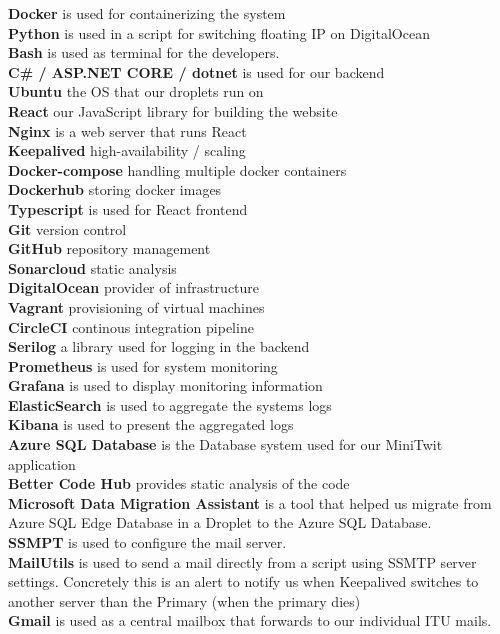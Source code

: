 \textbf{Docker} is used for containerizing the system \\
\textbf{Python} is used in a script for switching floating IP on DigitalOcean  \\
\textbf{Bash} is used as terminal for the developers. \\
\textbf{C\# / ASP.NET CORE / dotnet} is used for our backend \\
\textbf{Ubuntu} the OS that our droplets run on\\
\textbf{React} our JavaScript library for building the website \\
\textbf{Nginx} is a web server that runs React\\
\textbf{Keepalived} high-availability / scaling \\
\textbf{Docker-compose} handling multiple docker containers \\
\textbf{Dockerhub} storing docker images \\
\textbf{Typescript} is used for React frontend \\
\textbf{Git} version control \\
\textbf{GitHub} repository management \\
\textbf{Sonarcloud} static analysis \\
\textbf{DigitalOcean} provider of infrastructure \\
\textbf{Vagrant} provisioning of virtual machines \\
\textbf{CircleCI} continous integration pipeline \\
\textbf{Serilog} a library used for logging in the backend \\
\textbf{Prometheus} is used for system monitoring \\
\textbf{Grafana} is used to display monitoring information \\
\textbf{ElasticSearch} is used to aggregate the systems logs \\
\textbf{Kibana} is used to present the aggregated logs \\
\textbf{Azure SQL Database} is the Database system used for our MiniTwit application\\
\textbf{Better Code Hub} provides static analysis of the code \\
\textbf{Microsoft Data Migration Assistant} is a tool that helped us migrate from Azure SQL Edge Database in a Droplet to the Azure SQL Database.\\
\textbf{SSMPT} is used to configure the mail server.\\
\textbf{MailUtils} is used to send a mail directly from a script using SSMTP server settings. Concretely this is an alert to notify us when Keepalived switches to another server than the Primary (when the primary dies)\\
\textbf{Gmail} is used as a central mailbox that forwards to our individual ITU mails.\\


